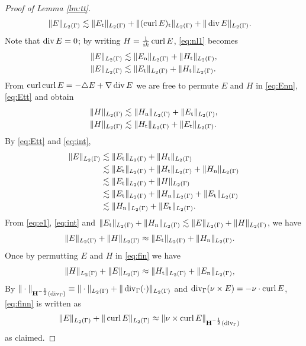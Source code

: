 \begin{proof}[Proof of Lemma \ref{lm:tt}]
\begin{equation}
\begin{split}
      \|E\|_{L_2(\Gamma)} &\lesssim \|E_{\text{t}}\|_{L_2(\Gamma)}+\|(\operatorname{curl} E)_{\text{t}}\|_{L_2(\Gamma)}+\|\operatorname{div} E\|_{L_2(\Gamma)}.
    \end{split}
  \end{equation}
  Note that $\operatorname{div} E=0$; by writing $H=\frac{1}{ik}\operatorname{curl} E$, \eqref{eq:nl1} becomes
  \begin{align}
    \|E\|_{L_2(\Gamma)} &\lesssim \|E_{\text{n}}\|_{L_2(\Gamma)}+\|H_{\text{t}}\|_{L_2(\Gamma)},\label{eq:Enn}\\
    \|E\|_{L_2(\Gamma)} &\lesssim \|E_{\text{t}}\|_{L_2(\Gamma)}+\|H_{\text{t}}\|_{L_2(\Gamma)}.\label{eq:Ett}
  \end{align}
  From $\operatorname{curl}\operatorname{curl} E=-\triangle E+\nabla\operatorname{div} E$ we are free to permute $E$ 
  and $H$ in \eqref{eq:Enn}, \eqref{eq:Ett} and obtain
  \begin{align}
    \|H\|_{L_2(\Gamma)} &\lesssim \|H_{\text{n}}\|_{L_2(\Gamma)}+\|E_{\text{t}}\|_{L_2(\Gamma)},\label{eq:int}\\
    \|H\|_{L_2(\Gamma)} &\lesssim \|H_{\text{t}}\|_{L_2(\Gamma)}+\|E_{\text{t}}\|_{L_2(\Gamma)}.\label{eq:intt}
  \end{align}
  By \eqref{eq:Ett} and \eqref{eq:int},
  \begin{equation}
    \begin{split}\label{eq:e1}
      \|E\|_{L_2(\Gamma)} &\lesssim \|E_{\text{t}}\|_{L_2(\Gamma)}+\|H_{\text{t}}\|_{L_2(\Gamma)}\\
      &\lesssim \|E_{\text{t}}\|_{L_2(\Gamma)}+\|H_{\text{t}}\|_{L_2(\Gamma)}+\|H_{\text{n}}\|_{L_2(\Gamma)}\\
      &\lesssim \|E_{\text{t}}\|_{L_2(\Gamma)}+\|H\|_{L_2(\Gamma)}\\
      &\lesssim\|E_{\text{t}}\|_{L_2(\Gamma)}+\|H_{\text{n}}\|_{L_2(\Gamma)}+\|E_{\text{t}}\|_{L_2(\Gamma)}\\
      &\lesssim\|H_{\text{n}}\|_{L_2(\Gamma)}+\|E_{\text{t}}\|_{L_2(\Gamma)}.
    \end{split}
  \end{equation}
  From \eqref{eq:e1}, \eqref{eq:int} and $\|E_{\text{t}}\|_{L_2(\Gamma)}+\|H_{\text{n}}\|_{L_2(\Gamma)}\lesssim\|E\|_{L_2(\Gamma)}
  +\|H\|_{L_2(\Gamma)}$, we have 
  \begin{align}
    \|E\|_{L_2(\Gamma)}+\|H\|_{L_2(\Gamma)} &\approx \|E_{\text{t}}\|_{L_2(\Gamma)}+\|H_{\text{n}}\|_{L_2(\Gamma)}.\label{eq:fin}
  \end{align}
  Once by permutting $E$ and $H$ in \eqref{eq:fin} we have
  \begin{align}
    \|H\|_{L_2(\Gamma)}+\|E\|_{L_2(\Gamma)} &\approx \|H_{\text{t}}\|_{L_2(\Gamma)}+\|E_{\text{n}}\|_{L_2(\Gamma)},\label{eq:finn}
  \end{align}
  By $\|\cdot\|_{{\bf H}^{-\frac{1}{2}}(\operatorname{div}_\Gamma)}\equiv\|\cdot\|_{L_2(\Gamma)}+\|\operatorname{div}_\Gamma(\cdot)\|_{L_2(\Gamma)}$ and $\operatorname{div}_\Gamma(\nu\times E)=-\nu\cdot\operatorname{curl} E$, \eqref{eq:finn} is written as
  \begin{align}
    \|E\|_{L_2(\Gamma)} + \|\operatorname{curl} E\|_{L_2(\Gamma)} &\approx \|\nu\times\operatorname{curl} E\|_{{\bf H}^{-\frac{1}{2}}(\operatorname{div}_\Gamma)}
  \end{align}
  as claimed.
\end{proof}



